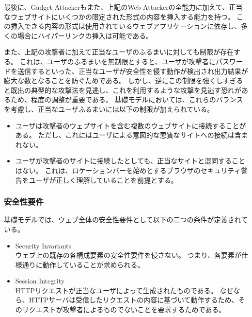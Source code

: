\documentclass[12pt,a4paper]{jbook}
\begin{document}
最後に、Gadget Attackerもまた、上記のWeb Attackerの全能力に加えて、正当なウェブサイトにいくつかの限定された形式の内容を挿入する能力を持つ。
この挿入できる内容の形式は使用されているウェブアプリケーションに依存し、多くの場合にハイパーリンクの挿入は可能である。

また、上記の攻撃者に加えて正当なユーザのふるまいに対しても制限が存在する。
これは、ユーザのふるまいを無制限とすると、ユーザが攻撃者にパスワードを送信するといった、正当なユーザが安全性を侵す動作が検出され出力結果が膨大な数となることを防ぐためである。
しかし、逆にこの制限を強くしすぎると既出の典型的な攻撃法を見逃し、これを利用するような攻撃を見逃す恐れがあるため、程度の調整が重要である。
基礎モデルにおいては、これらのバランスを考慮し、正当なユーザふるまいには以下の制限が加えられている。
\begin{itemize}
\item ユーザは攻撃者のウェブサイトを含む複数のウェブサイトに接続することがある。
ただし、これにはユーザによる意図的な悪質なサイトへの接続は含まれない。
\item ユーザが攻撃者のサイトに接続したとしても、正当なサイトと混同することはない。
これは、ロケーションバーを始めとするブラウザのセキュリティ警告をユーザが正しく理解していることを前提とする。
\end{itemize}

\subsubsection{安全性要件}
基礎モデルでは、ウェブ全体の安全性要件として以下の二つの条件が定義されている。
\begin{itemize}
\item Security Invariants\\
ウェブ上の既存の各構成要素の安全性要件を侵さない。
つまり、各要素が仕様通りに動作していることが求められる。
\item Session Integrity\\
HTTPリクエストが正当なユーザによって生成されたものである。
なぜなら、HTTPサーバは受信したリクエストの内容に基づいて動作するため、そのリクエストが攻撃者によるものでないことを要求するためである。
\end{itemize}
\end{document}
